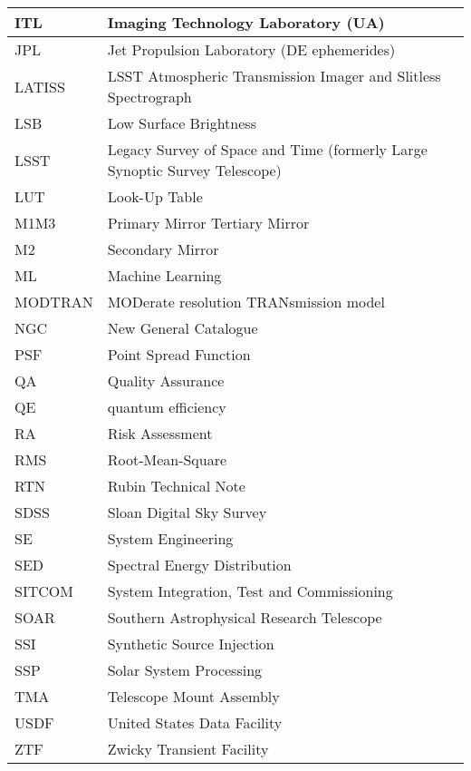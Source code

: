 \begin{longtable}{p{}p{}}
ITL & Imaging Technology Laboratory (UA) \\\hline
JPL & Jet Propulsion Laboratory (DE ephemerides) \\\hline
LATISS & LSST Atmospheric Transmission Imager and Slitless Spectrograph \\\hline
LSB & Low Surface Brightness \\\hline
LSST & Legacy Survey of Space and Time (formerly Large Synoptic Survey Telescope) \\\hline
LUT & Look-Up Table \\\hline
M1M3 & Primary Mirror Tertiary Mirror \\\hline
M2 & Secondary Mirror \\\hline
ML & Machine Learning \\\hline
MODTRAN & MODerate resolution TRANsmission model \\\hline
NGC & New General Catalogue \\\hline
PSF & Point Spread Function \\\hline
QA & Quality Assurance \\\hline
QE & quantum efficiency \\\hline
RA & Risk Assessment \\\hline
RMS & Root-Mean-Square \\\hline
RTN & Rubin Technical Note \\\hline
SDSS & Sloan Digital Sky Survey \\\hline
SE & System Engineering \\\hline
SED & Spectral Energy Distribution \\\hline
SITCOM & System Integration, Test and Commissioning \\\hline
SOAR & Southern Astrophysical Research Telescope \\\hline
SSI & Synthetic Source Injection \\\hline
SSP & Solar System Processing \\\hline
TMA & Telescope Mount Assembly \\\hline
USDF & United States Data Facility \\\hline
ZTF & Zwicky Transient Facility \\\hline
\end{longtable}
